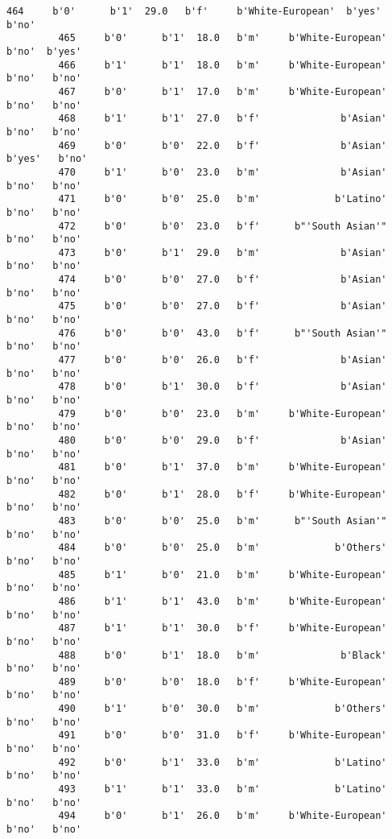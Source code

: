 \documentclass[11pt]{article}
\begin{document}
\begin{Verbatim}[commandchars=\\\{\}]
         464     b'0'      b'1'  29.0   b'f'     b'White-European'  b'yes'   b'no'   
         465     b'0'      b'1'  18.0   b'm'     b'White-European'   b'no'  b'yes'   
         466     b'1'      b'1'  18.0   b'm'     b'White-European'   b'no'   b'no'   
         467     b'0'      b'1'  17.0   b'm'     b'White-European'   b'no'   b'no'   
         468     b'1'      b'1'  27.0   b'f'              b'Asian'   b'no'   b'no'   
         469     b'0'      b'0'  22.0   b'f'              b'Asian'  b'yes'   b'no'   
         470     b'1'      b'0'  23.0   b'm'              b'Asian'   b'no'   b'no'   
         471     b'0'      b'0'  25.0   b'm'             b'Latino'   b'no'   b'no'   
         472     b'0'      b'0'  23.0   b'f'      b"'South Asian'"   b'no'   b'no'   
         473     b'0'      b'1'  29.0   b'm'              b'Asian'   b'no'   b'no'   
         474     b'0'      b'0'  27.0   b'f'              b'Asian'   b'no'   b'no'   
         475     b'0'      b'0'  27.0   b'f'              b'Asian'   b'no'   b'no'   
         476     b'0'      b'0'  43.0   b'f'      b"'South Asian'"   b'no'   b'no'   
         477     b'0'      b'0'  26.0   b'f'              b'Asian'   b'no'   b'no'   
         478     b'0'      b'1'  30.0   b'f'              b'Asian'   b'no'   b'no'   
         479     b'0'      b'0'  23.0   b'm'     b'White-European'   b'no'   b'no'   
         480     b'0'      b'0'  29.0   b'f'              b'Asian'   b'no'   b'no'   
         481     b'0'      b'1'  37.0   b'm'     b'White-European'   b'no'   b'no'   
         482     b'0'      b'1'  28.0   b'f'     b'White-European'   b'no'   b'no'   
         483     b'0'      b'0'  25.0   b'm'      b"'South Asian'"   b'no'   b'no'   
         484     b'0'      b'0'  25.0   b'm'             b'Others'   b'no'   b'no'   
         485     b'1'      b'0'  21.0   b'm'     b'White-European'   b'no'   b'no'   
         486     b'1'      b'1'  43.0   b'm'     b'White-European'   b'no'   b'no'   
         487     b'1'      b'1'  30.0   b'f'     b'White-European'   b'no'   b'no'   
         488     b'0'      b'1'  18.0   b'm'              b'Black'   b'no'   b'no'   
         489     b'0'      b'0'  18.0   b'f'     b'White-European'   b'no'   b'no'   
         490     b'1'      b'0'  30.0   b'm'             b'Others'   b'no'   b'no'   
         491     b'0'      b'0'  31.0   b'f'     b'White-European'   b'no'   b'no'   
         492     b'0'      b'1'  33.0   b'm'             b'Latino'   b'no'   b'no'   
         493     b'1'      b'1'  33.0   b'm'             b'Latino'   b'no'   b'no'   
         494     b'0'      b'1'  26.0   b'm'     b'White-European'   b'no'   b'no'   

\end{Verbatim}
\end{document}
